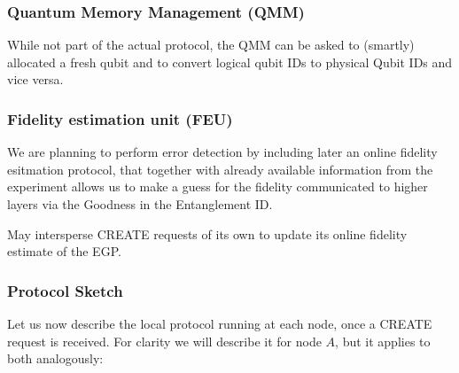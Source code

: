 \documentclass{article}
\begin{document}
\subsubsection{Quantum Memory Management (QMM)}
While not part of the actual protocol, the QMM can be asked to (smartly) allocated a fresh qubit and to convert logical qubit IDs to physical Qubit IDs and vice versa.

\subsubsection{Fidelity estimation unit (FEU)}
We are planning to perform error detection by including later an online fidelity esitmation protocol, that together with already available information from the experiment allows us to make a guess for the fidelity communicated to higher layers via the Goodness in the Entanglement ID.

May intersperse CREATE requests of its own to update its online fidelity estimate of the EGP.

\subsubsection{Protocol Sketch}

Let us now describe the local protocol running at each node, once a CREATE request is received. For clarity we will describe it for node $A$, but
it applies to both analogously:
\end{document}
